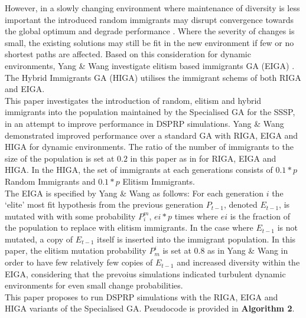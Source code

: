\documentclass[
	a4paper, %
	10pt, %
	unnumberedsections, %
	twoside, %
]{LTJournalArticle}
\begin{document}
However, in a slowly changing environment where maintenance of diversity is less important the introduced random immigrants may disrupt convergence towards the global optimum and degrade performance \cite{yang:10}. Where the severity of changes is small, the existing solutions may still be fit in the new environment if few or no shortest paths are affected. Based on this consideration for dynamic environments, Yang \& Wang investigate elitism based immigrants GA (EIGA) \cite{yang:10}. The Hybrid Immigrants GA (HIGA) utilises the immigrant schems of both RIGA and EIGA. \\

This paper investigates the introduction of random, elitism and hybrid immigrants into the population maintained by the Specialised GA for the SSSP, in an attempt to improve performance in DSPRP simulations. Yang \& Wang demonstrated improved performance over a standard GA with RIGA, EIGA and HIGA for dynamic environments. The ratio of the number of immigrants to the size of the population is set at \(0.2\) in this paper as in \cite{yang:10} for RIGA, EIGA and HIGA. In the HIGA, the set of immigrants at each generations consists of \(0.1 * p\) Random Immigrants and \(0.1 * p\) Elitism Immigrants. \\

The EIGA is specified by Yang \& Wang as follows: For each generation \(i\) the `elite' most fit hypothesis from the previous generation \(P_{t-1}\), denoted \(E_{t-1}\), is mutated with with some probability \(P_{i}^{m}\), \(ei * p\) times where \(ei\) is the fraction of the population to replace with elitism immigrants. In the case where \(E_{t-1}\) is not mutated, a copy of \(E_{t-1}\) itself is inserted into the immigrant population. In this paper, the elitism mutation probability \(P^{i}_{m}\) is set at \(0.8\) as in Yang \& Wang \cite{yang:10} in order to have few relatively few copies of \(E_{t-1}\) and increased diversity within the EIGA, considering that the prevoius simulations indicated turbulent dynamic environments for even small change probabilities. \\

This paper proposes to run DSPRP simulations with the RIGA, EIGA and HIGA variants of the Specialised GA. Pseudocode is provided in \textbf{Algorithm 2}. 
\end{document}
